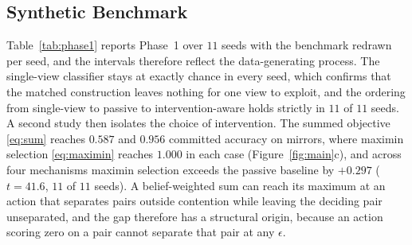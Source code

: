 \documentclass{article} %
\theoremstyle{defstyle}
\theoremstyle{plain}
\begin{document}
\subsection{Synthetic Benchmark}
\label{sec:res-synth}

Table~\ref{tab:phase1} reports Phase~1 over $11$ seeds with the benchmark redrawn per seed,
and the intervals therefore reflect the data-generating process. The single-view classifier
stays at exactly chance in every seed, which confirms that the matched construction leaves
nothing for one view to exploit, and the ordering from single-view to passive to
intervention-aware holds strictly in $11$ of $11$ seeds. A second study then isolates the
choice of intervention. The summed objective \eqref{eq:sum} reaches $0.587$ and $0.956$
committed accuracy on mirrors, where maximin selection \eqref{eq:maximin} reaches $1.000$
in each case (Figure~\ref{fig:main}c), and across four mechanisms maximin selection exceeds
the passive baseline by $+0.297$ ($t = 41.6$, $11$ of $11$ seeds). A belief-weighted sum can
reach its maximum at an action that separates pairs outside contention while leaving the
deciding pair unseparated, and the gap therefore has a structural origin, because an action
scoring zero on a pair cannot separate that pair at any $\epsilon$.
\end{document}
